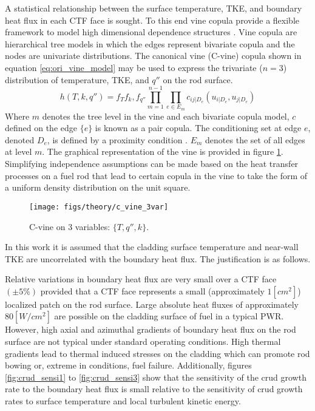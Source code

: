 A statistical relationship between the surface temperature, TKE, and boundary heat flux in each CTF face is sought.  To this end vine copula provide a flexible framework to model high dimensional dependence structures \cite{Joe2015}. Vine copula are hierarchical tree models in which the edges represent bivariate copula and the nodes are univariate distributions.  The canonical vine (C-vine) copula shown in equation \ref{eq:ori_vine_model} may be used to express the trivariate ($n=3$) distribution of temperature, TKE, and $q''$ on the rod surface.
\begin{equation}
h(T, k, q'') = f_T f_k, f_{q''} \prod_{m=1}^{n-1} \prod_{e \in E_m} c_{ij|D_e}(u_{i|D_e}, u_{j|D_e})
\label{eq:ori_vine_model}
\end{equation}
Where $m$ denotes the tree level in the vine and each bivariate copula model, $c$ defined on the edge $\{e\}$ is known as a pair copula.  The conditioning set at edge $e$, denoted $D_e$, is defined by a proximity condition  \cite{bedford2001}. $E_m$ denotes the set of all edges at level $m$. The graphical representation of the vine is provided in figure \ref{fig:cvine3var}.
Simplifying independence assumptions can be made based on the heat transfer processes on a fuel rod that lead to certain copula in the vine to take the form of a uniform density distribution on the unit square.

\begin{figure}[H]
    \centering
    \texttt{[image: figs/theory/c\_vine\_3var]}
    \caption{C-vine on 3 variables: $\{T,q'',k\}$.}
    \label{fig:cvine3var}
\end{figure}

In this work it is assumed that the cladding surface temperature and near-wall TKE are uncorrelated with the boundary heat flux.  The justification is as follows.

Relative variations in boundary heat flux are very small over a CTF face $(\pm 5\%)$ provided that a CTF face represents a small (approximately $1 [cm^2]$) localized patch on the rod surface.  Large absolute heat fluxes of approximately $80 [W/cm^2]$ are possible on the cladding surface of fuel in a typical PWR.  However, high axial and azimuthal gradients of boundary heat flux on the rod surface are not typical under standard operating conditions.  High thermal gradients lead to thermal induced stresses on the cladding which can promote rod bowing or, extreme in conditions, fuel failure.
Additionally, figures \ref{fig:crud_sensi1} to \ref{fig:crud_sensi3} show that the sensitivity of the crud growth rate to the boundary heat flux is small relative to the sensitivity of crud growth rates to surface temperature and local turbulent kinetic energy.


